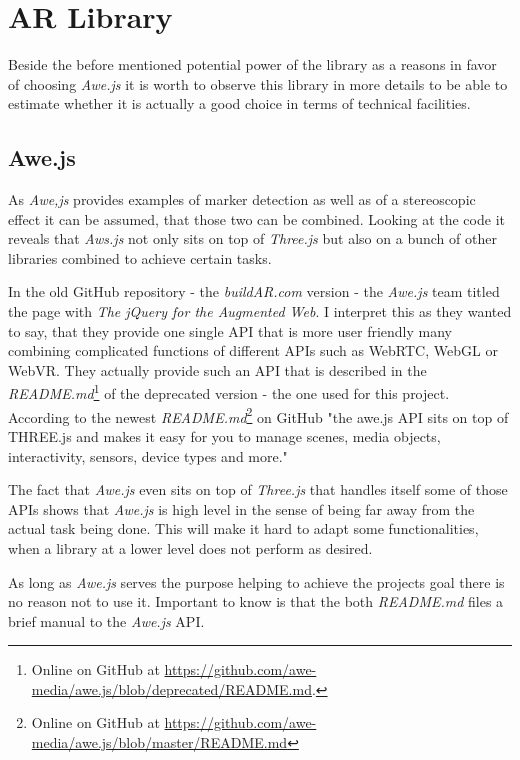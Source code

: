 \chapter{AR Library}
\label{chp:AR Library}

Beside the before mentioned potential power of the library as a reasons in favor of choosing \textit{Awe.js} it is worth to observe this library in more details to be able to estimate whether it is actually a good choice in terms of technical facilities.

\section{Awe.js}

As \textit{Awe,js} provides examples of marker detection as well as of a stereoscopic effect it can be assumed, that those two can be combined. Looking at the code it reveals that \textit{Aws.js} not only sits on top of \textit{Three.js} but also on a bunch of other libraries combined to achieve certain tasks. 
 
In the old GitHub repository - the \textit{buildAR.com} version - the \textit{Awe.js} team titled the page with \textit{The jQuery for the Augmented Web}. I interpret this as they wanted to say, that they provide one single API that is more user friendly many combining complicated functions of different APIs such as WebRTC, WebGL or WebVR. They actually provide such an API that is described in the \textit{README.md}\footnote{Online on GitHub at \url{https://github.com/awe-media/awe.js/blob/deprecated/README.md}.} of the deprecated version - the one used for this project. According to the newest \textit{README.md}\footnote{Online on GitHub at \url{https://github.com/awe-media/awe.js/blob/master/README.md}} on GitHub "the awe.js API sits on top of THREE.js and makes it easy for you to manage scenes, media objects, interactivity, sensors, device types and more." 

The fact that \textit{Awe.js} even sits on top of \textit{Three.js} that handles itself some of those APIs shows that \textit{Awe.js} is high level in the sense of being far away from the actual task being done. This will make it hard to adapt some functionalities, when a library at a lower level does not perform as desired.

As long as \textit{Awe.js} serves the purpose helping to achieve the projects goal there is no reason not to use it. Important to know is that the both \textit{README.md} files a brief manual to the \textit{Awe.js} API. 


